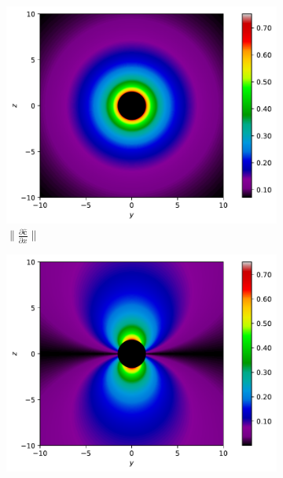 \begin{figure}[H]
	\centering
	\begin{subfigure}{0.32\textwidth}
		\centering
		\includegraphics[width=\textwidth]{images/pdf/Rate_of_change_of_lights_velocity_field_with_respect_to_x_u_is_0.pdf}
		\caption{$\|\frac{\partial \mathbf{\hat{c}}}{\partial x}\|$}
		\label{fig: Rate of change of lights velocity field of rest source subfig_1}
	\end{subfigure}
	\begin{subfigure}{0.32\textwidth}
		\centering
		\includegraphics[width=\textwidth]{images/pdf/Rate_of_change_of_lights_velocity_field_with_respect_to_y_u_is_0.pdf}

\end{subfigure}
\end{figure}
